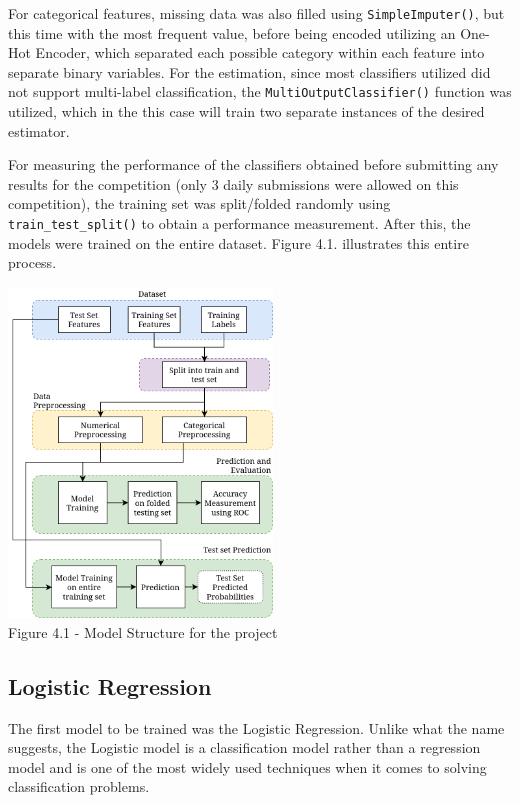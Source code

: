\documentclass{IEEEtran}
\begin{document}
For categorical features, missing data was also filled using \texttt{SimpleImputer()}, but this time with the most frequent value, before being encoded utilizing an One-Hot Encoder, which separated each possible category within each feature into separate binary variables.
For the estimation, since most classifiers utilized did not support multi-label classification, the \texttt{MultiOutputClassifier()} function was utilized, which in the this case will train two separate instances of the desired estimator.

For measuring the performance of the classifiers obtained before submitting any results for the competition (only 3 daily submissions were allowed on this competition), the training set was split/folded randomly using \texttt{train\_test\_split()} to obtain a performance measurement. After this, the models were trained on the entire dataset. Figure 4.1. illustrates this entire process.

\begin{center}
    \includegraphics[width=7cm]{figures/MethodologyStructure.png}\\
    Figure 4.1 - Model Structure for the project
\end{center}

\subsection{Logistic Regression}

The first model to be trained was the Logistic Regression. Unlike what the name suggests, the Logistic model is a classification model rather than a regression model and is one of the most widely used techniques when it comes to solving classification problems. 
\end{document}
